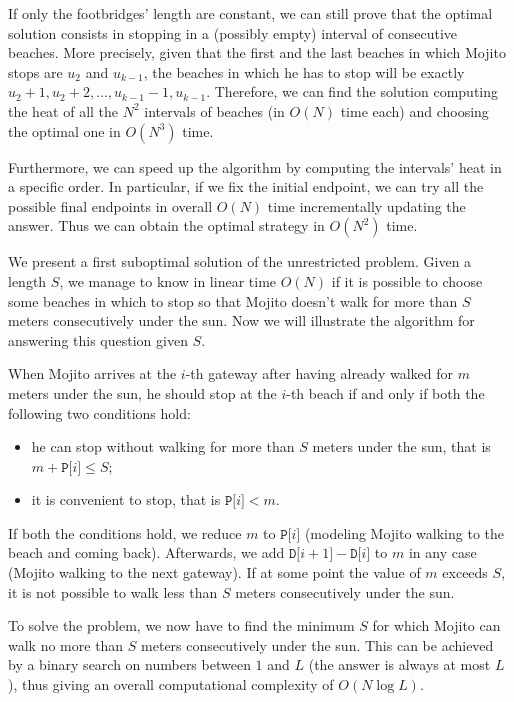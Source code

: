If only the footbridges' length are constant, we can still prove that the optimal solution consists in stopping in a (possibly empty) interval of consecutive beaches. More precisely, given that the first and the last beaches in which Mojito stops are $u_2$ and $u_{k-1}$, the beaches in which he has to stop will be exactly $u_2+1, u_2+2, \ldots, u_{k-1} - 1, u_{k-1}$.
Therefore, we can find the solution computing the heat of all the $N^2$ intervals of beaches (in $O(N)$ time each) and choosing the optimal one in $O(N^3)$ time.

Furthermore, we can speed up the algorithm by computing the intervals' heat in a specific order. In particular, if we fix the initial endpoint, we can try all the possible final endpoints in overall $O(N)$ time incrementally updating the answer. Thus we can obtain the optimal strategy in $O(N^2)$ time.


\RicBinaria

We present a first suboptimal solution of the unrestricted problem. Given a length $S$, we manage to know in linear time $O(N)$ if it is possible to choose some beaches in which to stop so that Mojito doesn't walk for more than $S$ meters consecutively under the sun. Now we will illustrate the algorithm for answering this question given $S$.

When Mojito arrives at the $i$-th gateway after having already walked for $m$ meters under the sun, he should stop at the $i$-th beach if and only if both the following two conditions hold:
\begin{itemize}
	\item he can stop without walking for more than $S$ meters under the sun, that is $ m + \texttt{P[}i\texttt{]} \le S$;
	\item it is convenient to stop, that is $\texttt{P[}i\texttt{]} < m$.
\end{itemize}
If both the conditions hold, we reduce $m$ to $\texttt{P[}i\texttt{]}$ (modeling Mojito walking to the beach and coming back). Afterwards, we add $\texttt{D[}i+1\texttt{]} - \texttt{D[}i\texttt{]}$ to $m$ in any case (Mojito walking to the next gateway). If at some point the value of $m$ exceeds $S$, it is not possible to walk less than $S$ meters consecutively under the sun.

To solve the problem, we now have to find the minimum $S$ for which Mojito can walk no more than $S$ meters consecutively under the sun. This can be achieved by a binary search on numbers between $1$ and $L$ (the answer is always at most $L$), thus giving an overall computational complexity of $O(N\log L)$.


